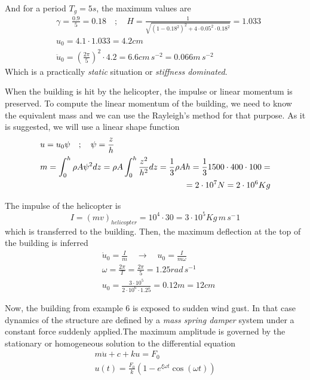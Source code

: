 And for a period $T_g=5s$, the maximum values are
\begin{align*}
&\gamma = \frac{0.9}{5} = 0.18 \quad ; \quad
H = \frac{1}{\sqrt{(1-0.18^2)^2 + 4\cdot 0.05^2\cdot 0.18^2}} = 1.033 \\
&u_0 = 4.1\cdot 1.033 = 4.2 cm \\
&\ddot{u}_0 = \left(\frac{2\pi}{5}\right)^2 \cdot 4.2 = 6.6cm\,s^{-2} = 0.066m\,s^{-2}
\end{align*}
Which is a practically \emph{static} situation or \emph{stiffness dominated}.



When the building is hit by the helicopter, the impulse or linear momentum is preserved. To compute the linear momentum of the building, we need to know the equivalent mass and we can use the Rayleigh's method for that purpose. As it is suggested, we will use a linear shape function
\begin{align*}
&u = u_0\psi \quad ; \quad \psi = \frac{z}{h} \\
&m = \int_0^h \rho A\psi^2dz = \rho A\int_0^h\frac{z^2}{h^2}dz = \frac{1}{3}\rho Ah = \frac{1}{3} 1500 \cdot 400 \cdot 100 = \\
& \pushright{= 2\cdot 10^7N = 2\cdot 10^6Kg}
\end{align*}

The impulse of the helicopter is
$$
I = (mv)_{helicopter} = 10^4 \cdot 30 = 3\cdot 10^5 Kg\,m\,s^-1
$$
which is transferred to the building. Then, the maximum deflection at the top of the building is inferred
\begin{align*}
&\dot{u}_0 = \frac{I}{m} \quad \rightarrow \quad u_0 = \frac{I}{m\omega} \\
&\omega = \frac{2\pi}{T} = \frac{2\pi}{5} = 1.25rad\,s^{-1} \\
&u_0 = \frac{3\cdot 10^5}{2\cdot 10^6\cdot 1.25} = 0.12m = 12cm
\end{align*}



Now, the building from example 6 is exposed to sudden wind gust. In that case dynamics of the  structure are defined by a \emph{mass spring damper} system under a constant force suddenly applied.The maximum amplitude is governed by the stationary or homogeneous solution to the differential equation
\begin{align*}
m\ddot{u} + c + ku = F_0 \\
u(t) = \frac{F_0}{k}(1 -e^{\xi\omega t}\cos(\omega t))
\end{align*}

